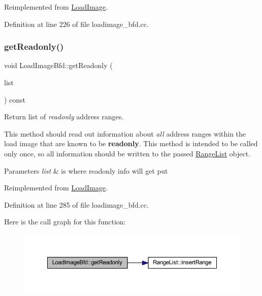 Reimplemented from \mbox{\hyperlink{class_load_image_af4a887cf44c719c576bb05605a4c5c7e}{Load\+Image}}.



Definition at line 226 of file loadimage\+\_\+bfd.\+cc.

\mbox{\label{class_load_image_bfd_a8a45d7f2aaa3ae3028f997978f1d9d0c}} 
\subsubsection{\texorpdfstring{getReadonly()}{getReadonly()}}
{\footnotesize\ttfamily void Load\+Image\+Bfd\+::get\+Readonly (\begin{DoxyParamCaption}\item[{\mbox{\hyperlink{class_range_list}{Range\+List}} \&}]{list }\end{DoxyParamCaption}) const\hspace{0.3cm}{\ttfamily [virtual]}}



Return list of {\itshape readonly} address ranges. 

This method should read out information about {\itshape all} address ranges within the load image that are known to be {\bfseries{readonly}}. This method is intended to be called only once, so all information should be written to the passed \mbox{\hyperlink{class_range_list}{Range\+List}} object. 
\begin{DoxyParams}{Parameters}
{\em list} & is where readonly info will get put \\
\hline
\end{DoxyParams}


Reimplemented from \mbox{\hyperlink{class_load_image_a31dba7f0f819c97e68f868cc623e4054}{Load\+Image}}.



Definition at line 285 of file loadimage\+\_\+bfd.\+cc.

Here is the call graph for this function\+:
\nopagebreak
\begin{figure}[H]
\begin{center}
\leavevmode
\includegraphics[width=350pt]{class_load_image_bfd_a8a45d7f2aaa3ae3028f997978f1d9d0c_cgraph}
\end{center}
\end{figure}
\mbox{\label{class_load_image_bfd_a78225283223f58c852c4b63af4fc8791}} 
